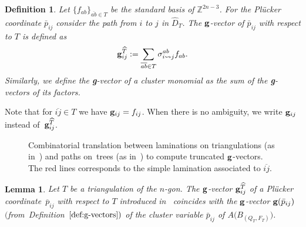 \documentclass[pdftex]{sigma}%
\newtheorem{Lemma}[Theorem]{Lemma}
\newtheorem{Definition}[Theorem]{Definition}
\numberwithin{equation}{section}
\begin{document}
\begin{Definition}
Let $\{f_{{ab}}\}_{\overline{ab}\in T}$ be the standard basis of $\mathbb{Z}^{2n-3}$.
For the Pl\"ucker coordinate $\bar p_{ij}$ consider the path from $i$ to $j$ in $\widehat D_T$. The ${\bf g}$-{\it vector} of $\bar p_{ij}$ with respect to $T$ is defined as
\begin{displaymath}
{\bf g}^{\widehat T}_{ij}:=\sum_{\overline{ab}\in T} \sigma_{i\rightsquigarrow j}^{ab}f_{ab}.
\end{displaymath}
Similarly, we define the {\bf g}-vector of a cluster monomial as the sum of the {\bf g}-vectors of its factors.
\end{Definition}
Note that for $\overline{ij}\in T$ we have ${\bf g}_{ij}=f_{ij}$.
When there is no ambiguity, we write ${\bf g}_{ij}$ instead of~${\bf g}^{\widehat T}_{ij}$.
\begin{figure}[ht]
 \centering
{}
 \caption{Combinatorial translation between laminations on triangulations (as in~\cite{fomin2018cluster}) and paths on~trees (as in~) to compute truncated ${\bf g}$-vectors. The red lines corresponds to the simple lamination associated to $\overline{ij} $.}
 \label{fig:gv dictionary}
\end{figure}
\begin{Lemma}
Let $T$ be a triangulation of the $n$-gon. The ${\bf g}$-vector ${\bf g}^{\widehat T}_{ij}$ of a Pl\"ucker coordinate~$\overline{p}_{ij}$ with respect to $T$ introduced in~ coincides with the ${\bf g}$-vector ${\bf g}(\bar p_{ij})$ $($from~Defi\-ni\-tion~$\ref{def:g-vectors})$ of the cluster variable $\bar p_{ij} $ of $ A\big(B_{(Q_T,F_T)}\big)$.
\end{Lemma}
\end{document}
